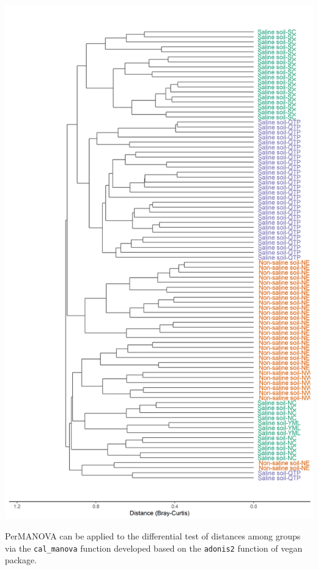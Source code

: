 \documentclass[
]{book}
\newenvironment{Shaded}{\begin{snugshade}}{\end{snugshade}}
\newcommand{\AttributeTok}[1]{\textcolor[rgb]{0.77,0.63,0.00}{#1}}
\newcommand{\CommentTok}[1]{\textcolor[rgb]{0.56,0.35,0.01}{\textit{#1}}}
\newcommand{\ConstantTok}[1]{\textcolor[rgb]{0.00,0.00,0.00}{#1}}
\newcommand{\FunctionTok}[1]{\textcolor[rgb]{0.00,0.00,0.00}{#1}}
\newcommand{\NormalTok}[1]{#1}
\newcommand{\SpecialCharTok}[1]{\textcolor[rgb]{0.00,0.00,0.00}{#1}}
\begin{document}
\begin{center}\includegraphics[width=550px]{Images/plot_clustering} \end{center}

PerMANOVA\citep{Anderson_Austral_2001} can be applied to the differential test of distances among groups via the \texttt{cal\_manova} function developed
based on the \texttt{adonis2} function of vegan package.

\begin{Shaded}
\end{Shaded}
\end{document}
